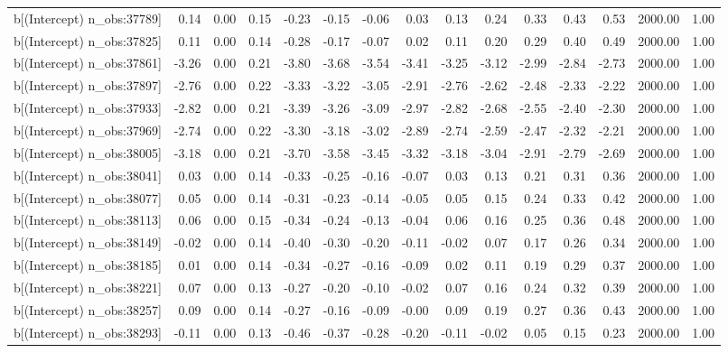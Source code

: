 \begin{table}[ht]
\begin{tabular}{rrrrrrrrrrrrrrr}
  b[(Intercept) n\_obs:37789] & 0.14 & 0.00 & 0.15 & -0.23 & -0.15 & -0.06 & 0.03 & 0.13 & 0.24 & 0.33 & 0.43 & 0.53 & 2000.00 & 1.00 \\ 
  b[(Intercept) n\_obs:37825] & 0.11 & 0.00 & 0.14 & -0.28 & -0.17 & -0.07 & 0.02 & 0.11 & 0.20 & 0.29 & 0.40 & 0.49 & 2000.00 & 1.00 \\ 
  b[(Intercept) n\_obs:37861] & -3.26 & 0.00 & 0.21 & -3.80 & -3.68 & -3.54 & -3.41 & -3.25 & -3.12 & -2.99 & -2.84 & -2.73 & 2000.00 & 1.00 \\ 
  b[(Intercept) n\_obs:37897] & -2.76 & 0.00 & 0.22 & -3.33 & -3.22 & -3.05 & -2.91 & -2.76 & -2.62 & -2.48 & -2.33 & -2.22 & 2000.00 & 1.00 \\ 
  b[(Intercept) n\_obs:37933] & -2.82 & 0.00 & 0.21 & -3.39 & -3.26 & -3.09 & -2.97 & -2.82 & -2.68 & -2.55 & -2.40 & -2.30 & 2000.00 & 1.00 \\ 
  b[(Intercept) n\_obs:37969] & -2.74 & 0.00 & 0.22 & -3.30 & -3.18 & -3.02 & -2.89 & -2.74 & -2.59 & -2.47 & -2.32 & -2.21 & 2000.00 & 1.00 \\ 
  b[(Intercept) n\_obs:38005] & -3.18 & 0.00 & 0.21 & -3.70 & -3.58 & -3.45 & -3.32 & -3.18 & -3.04 & -2.91 & -2.79 & -2.69 & 2000.00 & 1.00 \\ 
  b[(Intercept) n\_obs:38041] & 0.03 & 0.00 & 0.14 & -0.33 & -0.25 & -0.16 & -0.07 & 0.03 & 0.13 & 0.21 & 0.31 & 0.36 & 2000.00 & 1.00 \\ 
  b[(Intercept) n\_obs:38077] & 0.05 & 0.00 & 0.14 & -0.31 & -0.23 & -0.14 & -0.05 & 0.05 & 0.15 & 0.24 & 0.33 & 0.42 & 2000.00 & 1.00 \\ 
  b[(Intercept) n\_obs:38113] & 0.06 & 0.00 & 0.15 & -0.34 & -0.24 & -0.13 & -0.04 & 0.06 & 0.16 & 0.25 & 0.36 & 0.48 & 2000.00 & 1.00 \\ 
  b[(Intercept) n\_obs:38149] & -0.02 & 0.00 & 0.14 & -0.40 & -0.30 & -0.20 & -0.11 & -0.02 & 0.07 & 0.17 & 0.26 & 0.34 & 2000.00 & 1.00 \\ 
  b[(Intercept) n\_obs:38185] & 0.01 & 0.00 & 0.14 & -0.34 & -0.27 & -0.16 & -0.09 & 0.02 & 0.11 & 0.19 & 0.29 & 0.37 & 2000.00 & 1.00 \\ 
  b[(Intercept) n\_obs:38221] & 0.07 & 0.00 & 0.13 & -0.27 & -0.20 & -0.10 & -0.02 & 0.07 & 0.16 & 0.24 & 0.32 & 0.39 & 2000.00 & 1.00 \\ 
  b[(Intercept) n\_obs:38257] & 0.09 & 0.00 & 0.14 & -0.27 & -0.16 & -0.09 & -0.00 & 0.09 & 0.19 & 0.27 & 0.36 & 0.43 & 2000.00 & 1.00 \\ 
  b[(Intercept) n\_obs:38293] & -0.11 & 0.00 & 0.13 & -0.46 & -0.37 & -0.28 & -0.20 & -0.11 & -0.02 & 0.05 & 0.15 & 0.23 & 2000.00 & 1.00 \\ 

\end{tabular}
\end{table}

